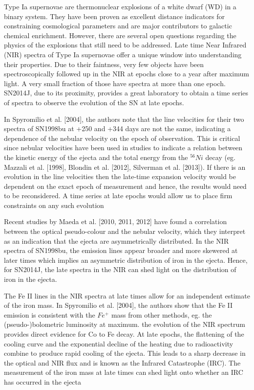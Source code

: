 \documentclass[11pt]{article}
\begin{document}
\sciencejustification    %
Type Ia supernovae are thermonuclear explosions of a white dwarf (WD) in a binary system. They have been proven as excellent distance indicators for constraining cosmological parameters and are major contributors to galactic chemical enrichment. However, there are several open questions regarding the physics of the explosions that still need to be addressed. 
Late time Near Infrared (NIR) spectra of Type Ia supernovae offer a unique window into understanding their properties. Due to their faintness, very few objects have been spectroscopically followed up in the NIR at epochs close to a year after maximum light. A very small fraction of those have spectra at more than one epoch.
SN2014J, due to its proximity, provides a great laboratory to obtain a time series of spectra to observe the evolution of the SN at late epochs.

In Spyromilio et al. [2004], the authors note that the line velocities for their two spectra of SN1998bu at +250 and +344 days are not the same, indicating a dependence of the nebular velocity on the epoch of observation. This is critical since nebular velocities have been used in studies to indicate a relation between the kinetic energy of the ejecta and the total energy from the $^{56} Ni$ decay (eg. Mazzali et al. [1998], Blondin et al. [2012], Silverman et al. [2013]). If there is an evolution in the line velocities then the late-time expansion velocity would be dependent on the exact epoch of measurement and hence, the results would need to be reconsidered. A time series at late epochs would allow us to place firm constraints on any such evolution

Recent studies by Maeda et al. [2010, 2011, 2012] have found a correlation between the optical pseudo-colour and the nebular velocity, which they interpret as an indication that the ejecta are asymmetrically distributed. In the NIR spectra of SN1998bu, the emission lines appear broader and more skewered at later times which implies an asymmetric distribution of iron in the ejecta. Hence, for SN2014J, the late spectra in the NIR can shed light on the distribution of iron in the ejecta. 

The Fe II lines in the NIR spectra at late times allow for an independent estimate of the iron mass. In Spyromilio et al. [2004], the authors show that the Fe II emission is consistent with the $Fe^{+}$  mass from other methods, eg. the (pseudo-)bolometric luminosity at maximum.
the evolution of the NIR spectrum provides  direct evidence for Co to Fe decay. 
 At late epochs, the flattening of the cooling curve and the exponential decline of the heating due to radioactivity combine to produce rapid cooling of the ejecta. This leads to a sharp decrease in the optical and NIR flux and is known as the Infrared Catastrophe (IRC). The measurement of the iron mass at late times can shed light onto whether an IRC has occurred in the ejecta 
\end{document}
